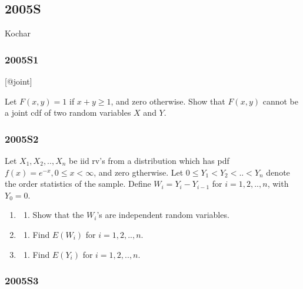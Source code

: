 \documentclass[6pt,twocolumn,Portrait]{article}
\providecommand{\tightlist}{%
  \setlength{\itemsep}{0pt}\setlength{\parskip}{0pt}}
\begin{document}
\hypertarget{s-1}{%
\subsection{2005S}\label{s-1}}

Kochar

\hypertarget{s1-1}{%
\subsubsection{2005S1}\label{s1-1}}

{[}@joint{]}

Let \(F(x,y)=1\) if \(x+y\ge1\), and zero otherwise. Show that
\(F(x,y)\) cannot be a joint cdf of two random variables \(X\) and
\(Y\).

\hypertarget{s2-1}{%
\subsubsection{2005S2}\label{s2-1}}

Let \(X_1,X_2,..,X_n\) be iid rv's from a distribution which has pdf
\(f(x)=e^{-x},0\le x<\infty\), and zero gtherwise. Let
\(0\le Y_1<Y_2<..<Y_n\) denote the order statistics of the sample.
Define \(W_i= Y_i-Y_{i-1}\) for \(i = 1,2,..,n\), with \(Y_0=0\).

\begin{enumerate}
\def\labelenumi{(\alph{enumi})}
\item
  \begin{enumerate}
  \def\labelenumii{(\arabic{enumii})}
  \setcounter{enumii}{5}
  \tightlist
  \item
    Show that the \(W_i\)'s are independent random variables.
  \end{enumerate}
\item
  \begin{enumerate}
  \def\labelenumii{(\arabic{enumii})}
  \setcounter{enumii}{2}
  \tightlist
  \item
    Find \(E(W_i)\) for \(i = 1,2,..,n\).
  \end{enumerate}
\item
  \begin{enumerate}
  \def\labelenumii{(\arabic{enumii})}
  \setcounter{enumii}{2}
  \tightlist
  \item
    Find \(E(Y_i)\) for \(i = 1,2,..,n\).
  \end{enumerate}
\end{enumerate}

\hypertarget{s3-1}{%
\subsubsection{2005S3}\label{s3-1}}
\end{document}

